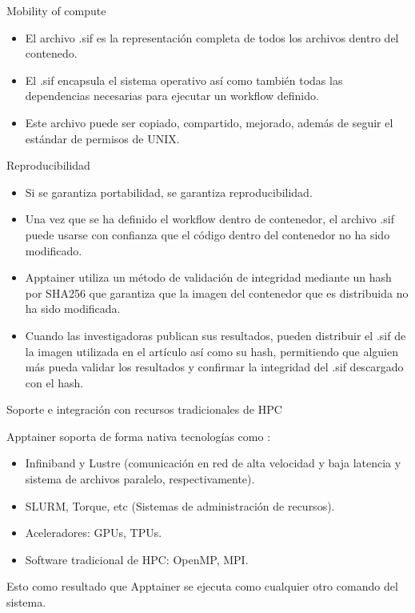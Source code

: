 \documentclass[11pt]{beamer}
\begin{document}
\begin{frame}{Mobility of compute}
  \begin{itemize}
 	\item El archivo .sif es la representación completa de todos los archivos dentro del contenedo.
 	\item El .sif encapsula el sistema operativo así como también todas las dependencias necesarias para ejecutar un workflow definido.
  	\item Este archivo puede ser copiado, compartido, mejorado, además de seguir el estándar de permisos de UNIX.
  \end{itemize}
\end{frame}


\begin{frame}{Reproducibilidad}
  \begin{itemize}
  	\item Si se garantiza portabilidad, se garantiza reproducibilidad.
 
  	\item Una vez que se ha definido el workflow dentro de contenedor, el archivo .sif puede usarse con confianza que el código dentro del contenedor no ha sido modificado.
  	\item Apptainer utiliza un método de validación de integridad mediante un hash por SHA256 que garantiza que la imagen del contenedor que es distribuida no ha sido modificada. 
  	\item Cuando las investigadoras publican sus resultados, pueden distribuir el .sif de la imagen utilizada en el artículo así como su hash, permitiendo que alguien más pueda validar los resultados y confirmar la integridad del .sif descargado con el hash. 
  \end{itemize}
\end{frame}

\begin{frame}{Soporte e integración con recursos tradicionales de HPC}

Apptainer soporta de forma nativa tecnologías como :
	\begin{itemize}
		\item Infiniband y Lustre (comunicación en red de alta velocidad y baja latencia y sistema de archivos paralelo, respectivamente).
		\item SLURM, Torque, etc (Sistemas de administración de recursos).
		\item Aceleradores: GPUs, TPUs.
		\item Software tradicional de HPC: OpenMP, MPI. 
	\end{itemize}

Esto como resultado que Apptainer se ejecuta como cualquier otro comando del sistema. 
\end{frame}
\end{document}
